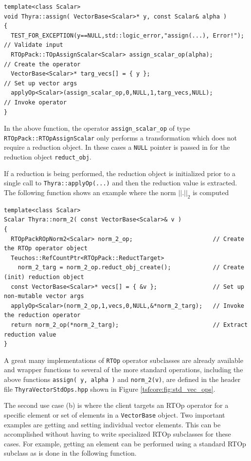 \documentclass[pdf,ps2pdf,11pt]{SANDreport}
\begin{document}
{\scriptsize\begin{verbatim}
template<class Scalar>
void Thyra::assign( VectorBase<Scalar>* y, const Scalar& alpha )
{
  TEST_FOR_EXCEPTION(y==NULL,std::logic_error,"assign(...), Error!");  // Validate input
  RTOpPack::TOpAssignScalar<Scalar> assign_scalar_op(alpha);           // Create the operator
  VectorBase<Scalar>* targ_vecs[] = { y };                             // Set up vector args
  applyOp<Scalar>(assign_scalar_op,0,NULL,1,targ_vecs,NULL);           // Invoke operator
}
\end{verbatim}}

{}\noindent{}In the above function, the operator
{}\texttt{assign\_scalar\_op} of type
{}\texttt{RTOpPack::RTOpAssignScalar} only performs a transformation
which does not require a reduction object.  In these cases a
{}\texttt{NULL} pointer is passed in for the reduction object
{}\texttt{reduct\_obj}.

If a reduction is being performed, the reduction object is initialized
prior to a single call to {}\texttt{Thyra::applyOp(\-...)} and then
the reduction value is extracted.  The following function shows an
example where the norm $||.||_2$ is computed

{\scriptsize\begin{verbatim}
template<class Scalar>
Scalar Thyra::norm_2( const VectorBase<Scalar>& v )
{
  RTOpPackROpNorm2<Scalar> norm_2_op;                       // Create the RTOp operator object
  Teuchos::RefCountPtr<RTOpPack::ReductTarget>
    norm_2_targ = norm_2_op.reduct_obj_create();            // Create (init) reduction object
  const VectorBase<Scalar>* vecs[] = { &v };                // Set up non-mutable vector args
  applyOp<Scalar>(norm_2_op,1,vecs,0,NULL,&*norm_2_targ);   // Invoke the reduction operator
  return norm_2_op(*norm_2_targ);                           // Extract reduction value
}
\end{verbatim}}

{}\noindent{}A great many implementations of {}\texttt{RTOp} operator
subclasses are already available and wrapper functions to several of
the more standard operations, including the above functions
{}\texttt{assign( y, alpha )} and {}\texttt{norm\_2(v)}, are defined
in the header file {}\texttt{Thyra\-Vector\-Std\-Ops.hpp} shown in
Figure {}\ref{tsfcore:fig:std_vec_ops}.

The second use case (b) is where the client targets an RTOp operator
for a specific element or set of elements in a {}\texttt{Vector\-Base}
object.  Two important examples are getting and setting individual
vector elements.  This can be accomplished without having to write
specialized RTOp subclasses for these cases.  For example, getting an
element can be performed using a standard RTOp subclass as is done in
the following function.
\end{document}
